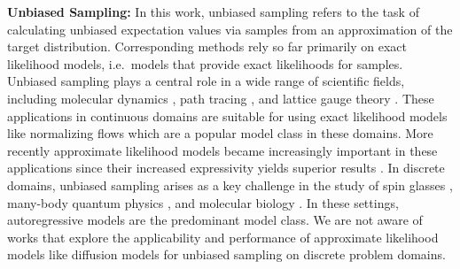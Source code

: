 \textbf{Unbiased Sampling:}
In this work, unbiased sampling refers to the task of calculating unbiased expectation values via samples from an approximation of the target distribution. Corresponding methods rely so far primarily on exact likelihood models, i.e.~models that provide exact likelihoods for samples. Unbiased sampling plays a central role in a wide range of scientific fields, including molecular dynamics \citep{BoltzmannGen,dibak2022temperature}, path tracing \citep{NeuralImportanceSampling}, and lattice gauge theory \citep{kanwar2020equivariant}. These applications in continuous domains are suitable for using exact likelihood models like normalizing flows which are a popular model class in these domains. More recently approximate likelihood models became increasingly important in these applications since their increased expressivity yields superior results \citep{dibak2022temperature,PathIntegralSampler, ContDiffModels4, jing2022torsional, berner2022optimal, ContDiffModels1, ContDiffModels3, ContDiffModels2,akhound2024iterated}. In discrete domains, unbiased sampling arises as a key challenge in the study of spin glasses \citep{unbiased1,unbiased2,inack2022neural,bialas2022hierarchical,biazzo2024sparse},  many-body quantum physics \citep{sharir2020deep,UnbiClusterUpdates}, and molecular biology \citep{cocco2018inverse}. In these settings, autoregressive models are the predominant model class. We are not aware of works that explore the applicability and performance of approximate likelihood models like diffusion models for unbiased sampling on discrete problem domains.